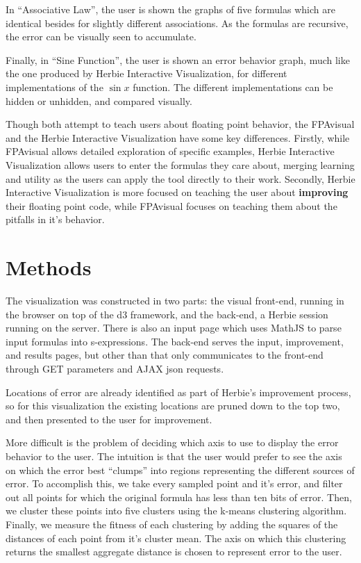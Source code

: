 \documentclass{chi2009}
\begin{document}
In ``Associative Law'', the user is shown the graphs of five formulas
which are identical besides for slightly different associations. As
the formulas are recursive, the error can be visually seen to
accumulate.

Finally, in ``Sine Function'', the user is shown an error behavior
graph, much like the one produced by Herbie Interactive Visualization,
for different implementations of the $\sin{x}$ function. The different
implementations can be hidden or unhidden, and compared visually.

Though both attempt to teach users about floating point behavior, the
FPAvisual and the Herbie Interactive Visualization have some key
differences. Firstly, while FPAvisual allows detailed exploration of
specific examples, Herbie Interactive Visualization allows users to
enter the formulas they care about, merging learning and utility as
the users can apply the tool directly to their work. Secondly, Herbie
Interactive Visualization is more focused on teaching the user about
\textbf{improving} their floating point code, while FPAvisual focuses
on teaching them about the pitfalls in it's behavior.

\section{Methods}
\label{sec:methods}
The visualization was constructed in two parts: the visual front-end,
running in the browser on top of the d3 framework, and the back-end, a
Herbie session running on the server. There is also an input page
which uses MathJS to parse input formulas into s-expressions. The
back-end serves the input, improvement, and results pages, but other
than that only communicates to the front-end through GET parameters
and AJAX json requests.

Locations of error are already identified as part of Herbie's
improvement process, so for this visualization the existing locations
are pruned down to the top two, and then presented to the user for
improvement.

More difficult is the problem of deciding which axis to use to display
the error behavior to the user. The intuition is that the user would
prefer to see the axis on which the error best ``clumps'' into regions
representing the different sources of error. To accomplish this, we
take every sampled point and it's error, and filter out all points for
which the original formula has less than ten bits of error. Then, we
cluster these points into five clusters using the k-means clustering
algorithm. Finally, we measure the fitness of each clustering by
adding the squares of the distances of each point from it's cluster
mean. The axis on which this clustering returns the smallest aggregate
distance is chosen to represent error to the user.
\end{document}
